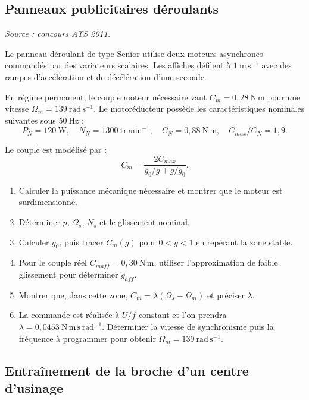 \subsection{Panneaux publicitaires déroulants}

\textit{Source : concours ATS 2011.}

\begin{minipage}{.73\linewidth}
Le panneau déroulant de type Senior utilise deux moteurs asynchrones commandés par des variateurs scalaires. Les affiches défilent à $1\ \mathrm{m\,s^{-1}}$ avec des rampes d'accélération et de décélération d'une seconde.

En régime permanent, le couple moteur nécessaire vaut $C_m=0{,}28\ \mathrm{N\,m}$ pour une vitesse $\Omega_m=139\ \mathrm{rad\,s^{-1}}$. Le motoréducteur possède les caractéristiques nominales suivantes sous $50\ \mathrm{Hz}$ :
\[
P_N=120\ \mathrm W,\quad N_N=1300\ \mathrm{tr\,min^{-1}},\quad
C_N=0{,}88\ \mathrm{N\,m},\quad C_{max}/C_N=1{,}9.
\]
\end{minipage}\hfill
\begin{minipage}{.23\linewidth}
\end{minipage}

Le couple est modélisé par :
\[
C_m=\frac{2C_{max}}{g_0/g+g/g_0}.
\]

\begin{enumerate}
  \item Calculer la puissance mécanique nécessaire et montrer que le moteur est surdimensionné.
  \item Déterminer $p$, $\Omega_s$, $N_s$ et le glissement nominal.
  \item Calculer $g_0$, puis tracer $C_m(g)$ pour $0<g<1$ en repérant la zone stable.
  \item Pour le couple réel $C_{maff}=0{,}30\ \mathrm{N\,m}$, utiliser l'approximation de faible glissement pour déterminer $g_{aff}$.
  \item Montrer que, dans cette zone, $C_m=\lambda(\Omega_s-\Omega_m)$ et préciser $\lambda$.
  \item La commande est réalisée à $U/f$ constant et l'on prendra $\lambda=0{,}0453\ \mathrm{N\,m\,s\,rad^{-1}}$. Déterminer la vitesse de synchronisme puis la fréquence à programmer pour obtenir $\Omega_m=139\ \mathrm{rad\,s^{-1}}$.
\end{enumerate}

\subsection{Entraînement de la broche d'un centre d'usinage}

